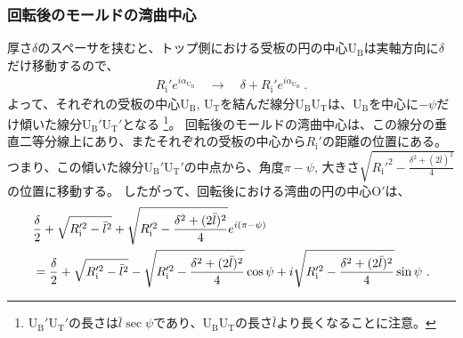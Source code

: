 \subsubsection{回転後のモールドの湾曲中心}
厚さ$\delta$のスペーサを挟むと、トップ側における受板の円の中心U$_\mathrm B$は実軸方向に$\delta$だけ移動するので、
\begin{align*}
  R_\mathrm i'e^{i\alpha_{\mathrm U_\mathrm B}}
  \quad\longrightarrow\quad
  \delta+R_\mathrm i'e^{i\alpha_{\mathrm U_\mathrm B}}\ .
\end{align*}
よって、それぞれの受板の中心U$_\mathrm B$, U$_\mathrm T$を結んだ線分U$_\mathrm B$U$_\mathrm T$は、U$_\mathrm B$を中心に$-\psi$だけ傾いた線分U$_\mathrm B'$U$_\mathrm T'$となる
\footnote{%
U$_\mathrm B'$U$_\mathrm T'$の長さは$\bar l\sec\psi$であり、U$_\mathrm B$U$_\mathrm T$の長さ$\bar l$より長くなることに注意。}。
回転後のモールドの湾曲中心は、この線分の垂直二等分線上にあり、またそれぞれの受板の中心から$R_\mathrm i'$の距離の位置にある。
つまり、この傾いた線分U$_\mathrm B'$U$_\mathrm T'$の中点から、角度$\pi-\psi$, 大きさ$\sqrt{R_\mathrm i'^2-\frac{\delta^2+(2\bar l)^2}4}$の位置に移動する。
したがって、回転後における湾曲の円の中心O$'$は、
\begin{align}
  \notag
  & \frac\delta2+\sqrt{R_\mathrm i'^2-\bar l^2}
    +\sqrt{R_\mathrm i'^2-\frac{\delta^2+(2\bar l)^2}4}e^{i(\pi-\psi)}\\
  & = \frac\delta2+\sqrt{R_\mathrm i'^2-\bar l^2}-\sqrt{R_\mathrm i'^2-\frac{\delta^2+(2\bar l)^2}4}\cos\psi
      +i\sqrt{R_\mathrm i'^2-\frac{\delta^2+(2\bar l)^2}4}\sin\psi\ .
    \label{eq:afterOrgin}
\end{align}


